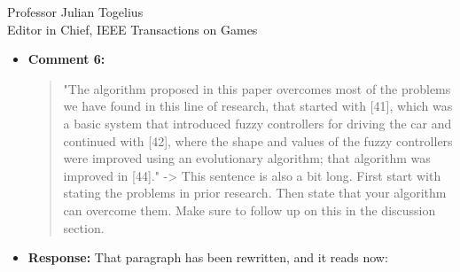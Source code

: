 \documentclass[10pt]{letter} %
\begin{document}
\begin{letter}{Professor Julian Togelius \\ Editor in Chief, IEEE Transactions on Games}
\begin{enumerate}
\begin{itemize}
				\textcolor{red}{
					If we can eliminate fitness, we can remove a source of uncertainty. We accomplish this by substituting a single (and uncertain) fitness  by a podium (a ranking after several races against other opponents) in which car controllers that win the most races will proceed to the next generation, while those that do not, will simply be removed from the pool. We can further reduce uncertainty even more by repeating races several times."
				}
		\item {\bf Comment 6:}
			\begin{quote}
				"The algorithm proposed in this paper overcomes most of the problems we have found in this line of research, that started with [41], which was a basic system that introduced fuzzy controllers for driving the car and continued with [42], where the shape and values of the fuzzy controllers were improved using an evolutionary algorithm; that algorithm
				was improved in [44]." -> This sentence is also a bit long. First start with stating the problems in prior research. Then state that your algorithm can overcome them. Make sure to follow up on this in the discussion section.
			\end{quote}
		\item {\bf Response:}
                  That paragraph has been rewritten, and it reads now:


\end{itemize}
\end{enumerate}
\end{letter}
\end{document}
